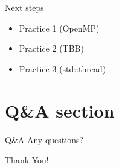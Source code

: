 \documentclass{beamer}
\begin{document}
\begin{frame}{Next steps}
    \begin{itemize}
        \item Practice 1 (OpenMP)
        \item Practice 2 (TBB)
        \item Practice 3 (std::thread)
    \end{itemize}
\end{frame}

\section{Q\&A section}

\begin{frame}{Q\&A}
    \centering
    Any questions?
\end{frame}

\begin{frame}
    \centering
    \Huge{Thank You!}
\end{frame}
\end{document}
